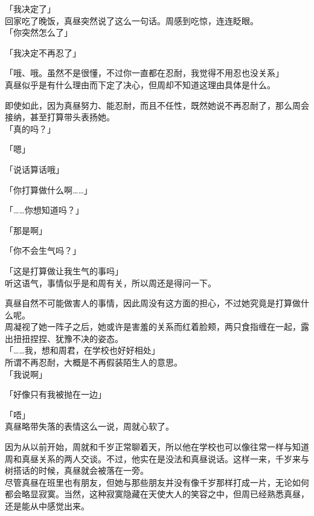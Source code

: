 「我决定了」\\

回家吃了晚饭，真昼突然说了这么一句话。周感到吃惊，连连眨眼。\\

「你突然怎么了」

「我决定不再忍了」

「哦、哦。虽然不是很懂，不过你一直都在忍耐，我觉得不用忍也没关系」\\

真昼似乎是有什么理由而下定了决心，但周却不知道这理由具体是什么。

即使如此，因为真昼努力、能忍耐，而且不任性，既然她说不再忍耐了，那么周会接纳，甚至打算带头表扬她。\\

「真的吗？」

「嗯」

「说话算话哦」

「你打算做什么啊……」

「……你想知道吗？」

「那是啊」

「你不会生气吗？」

「这是打算做让我生气的事吗」\\

听这语气，事情似乎是和周有关，所以周还是得问一下。

真昼自然不可能做害人的事情，因此周没有这方面的担心，不过她究竟是打算做什么呢。\\

周凝视了她一阵子之后，她或许是害羞的关系而红着脸颊，两只食指缠在一起，露出扭扭捏捏、犹豫不决的姿态。\\

「……我，想和周君，在学校也好好相处」\\

所谓不再忍耐，大概是不再假装陌生人的意思。\\

「我说啊」

「好像只有我被抛在一边」

「唔」\\

真昼略带失落的表情这么一说，周就心软了。

因为从以前开始，周就和千岁正常聊着天，所以他在学校也可以像往常一样与知道周和真昼关系的两人交谈。不过，他实在是没法和真昼说话。这样一来，千岁来与树搭话的时候，真昼就会被落在一旁。\\

尽管真昼在班里也有朋友，但她与那些朋友并没有像千岁那样打成一片，无论如何都会略显寂寞。当然，这种寂寞隐藏在天使大人的笑容之中，但周已经熟悉真昼，还是能从中感觉出来。\\

